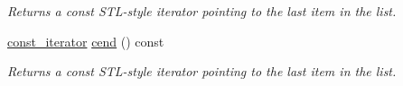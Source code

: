 \begin{DoxyCompactItemize}
\begin{DoxyCompactList}\small\item\em Returns a const S\+T\+L-\/style iterator pointing to the last item in the list. \end{DoxyCompactList}\item 
\hyperlink{class_mdt_1_1_deploy_utils_1_1_path_list_a2666c4c9348c4f7a28014d4de9599717}{const\+\_\+iterator} \hyperlink{class_mdt_1_1_deploy_utils_1_1_path_list_a0a36320111aac2c79060dbe778286f54}{cend} () const \hypertarget{class_mdt_1_1_deploy_utils_1_1_path_list_a0a36320111aac2c79060dbe778286f54}{}\label{class_mdt_1_1_deploy_utils_1_1_path_list_a0a36320111aac2c79060dbe778286f54}

\begin{DoxyCompactList}\small\item\em Returns a const S\+T\+L-\/style iterator pointing to the last item in the list. \end{DoxyCompactList}\end{DoxyCompactItemize}

